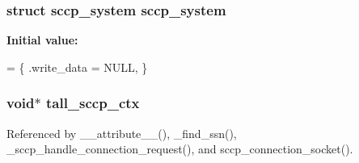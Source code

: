 \subsubsection[{sccp\+\_\+system}]{\setlength{\rightskip}{0pt plus 5cm}struct {\bf sccp\+\_\+system} {\bf sccp\+\_\+system}\hspace{0.3cm}{\ttfamily [static]}}\label{sccp_8c_a11325c39ad2233d6ee92cf75ab9cb543}
{\bfseries Initial value\+:}
\begin{DoxyCode}
= \{
        .write\_data = NULL,
\}
\end{DoxyCode}
\subsubsection[{tall\+\_\+sccp\+\_\+ctx}]{\setlength{\rightskip}{0pt plus 5cm}void$\ast$ tall\+\_\+sccp\+\_\+ctx\hspace{0.3cm}{\ttfamily [static]}}\label{sccp_8c_adb3ceca4a0faa4e6732101477fa4a5b3}


Referenced by \+\_\+\+\_\+attribute\+\_\+\+\_\+(), \+\_\+find\+\_\+ssn(), \+\_\+sccp\+\_\+handle\+\_\+connection\+\_\+request(), and sccp\+\_\+connection\+\_\+socket().


